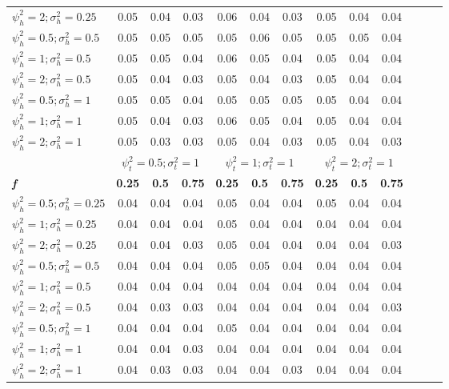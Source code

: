 \begin{table}[ht!]
{\begin{tabular}{l c c c c c c c c c c c c}
$\psi_h^2 = 2; \sigma_h^2 = 0.25$ & 0.05 & 0.04 & 0.03 & 0.06 & 0.04 & 0.03 & 0.05 & 0.04 & 0.04 \\
$\psi_h^2 = 0.5; \sigma_h^2 = 0.5$ & 0.05 & 0.05 & 0.05 & 0.05 & 0.06 & 0.05 & 0.05 & 0.05 & 0.04  \\
$\psi_h^2 = 1; \sigma_h^2 = 0.5$ & 0.05 & 0.05 & 0.04 & 0.06 & 0.05 & 0.04 & 0.05 & 0.04 & 0.04 \\
$\psi_h^2 = 2; \sigma_h^2 = 0.5$ & 0.05 & 0.04 & 0.03 & 0.05 & 0.04 & 0.03 & 0.05 & 0.04 & 0.04 \\
$\psi_h^2 = 0.5; \sigma_h^2 = 1$ & 0.05 & 0.05 & 0.04 & 0.05 & 0.05 & 0.05 & 0.05 & 0.04 & 0.04 \\
$\psi_h^2 = 1; \sigma_h^2 = 1$ & 0.05 & 0.04 & 0.03 & 0.06 & 0.05 & 0.04 & 0.05 & 0.04 & 0.04 \\
$\psi_h^2 = 2; \sigma_h^2 = 1$ & 0.05 & 0.03 & 0.03 & 0.05 & 0.04 & 0.03 & 0.05 & 0.04 & 0.03  \\
\hline 
 & \multicolumn{3}{c}{$\psi_t^2 = 0.5; \sigma_t^2 = 1$} & \multicolumn{3}{c}{$\psi_t^2 = 1; \sigma_t^2 = 1$} & \multicolumn{3}{c}{$\psi_t^2 = 2; \sigma_t^2 = 1$} \\
\cline{2-10}
\textbf{\textit{f}} & \textbf{0.25} & \textbf{0.5} & \textbf{0.75} & \textbf{0.25} & \textbf{0.5} & \textbf{0.75} & \textbf{0.25} & \textbf{0.5} & \textbf{0.75} \\
\hline
$\psi_h^2 = 0.5; \sigma_h^2 = 0.25$ & 0.04 & 0.04 & 0.04 & 0.05 & 0.04 & 0.04 & 0.05 & 0.04 & 0.04 \\
$\psi_h^2 = 1; \sigma_h^2 = 0.25$ & 0.04 & 0.04 & 0.04 & 0.05 & 0.04 & 0.04 & 0.04 & 0.04 & 0.04 \\
$\psi_h^2 = 2; \sigma_h^2 = 0.25$ & 0.04 & 0.04 & 0.03 & 0.05 & 0.04 & 0.04 & 0.04 & 0.04 & 0.03 \\
$\psi_h^2 = 0.5; \sigma_h^2 = 0.5$ & 0.04 & 0.04 & 0.04 & 0.05 & 0.05 & 0.04 & 0.04 & 0.04 & 0.04 \\
$\psi_h^2 = 1; \sigma_h^2 = 0.5$ & 0.04 & 0.04 & 0.04 & 0.04 & 0.04 & 0.04 & 0.04 & 0.04 & 0.04 \\
$\psi_h^2 = 2; \sigma_h^2 = 0.5$ & 0.04 & 0.03 & 0.03 & 0.04 & 0.04 & 0.04 & 0.04 & 0.04 & 0.03 \\
$\psi_h^2 = 0.5; \sigma_h^2 = 1$ & 0.04 & 0.04 & 0.04 & 0.05 & 0.04 & 0.04 & 0.04 & 0.04 & 0.04 \\
$\psi_h^2 = 1; \sigma_h^2 = 1$ & 0.04 & 0.04 & 0.03 & 0.04 & 0.04 & 0.04 & 0.04 & 0.04 & 0.04 \\
$\psi_h^2 = 2; \sigma_h^2 = 1$ & 0.04 & 0.03 & 0.03 & 0.04 & 0.04 & 0.03 & 0.04 & 0.04 & 0.04 \\
\bottomrule
\end{tabular}}
\end{table}


